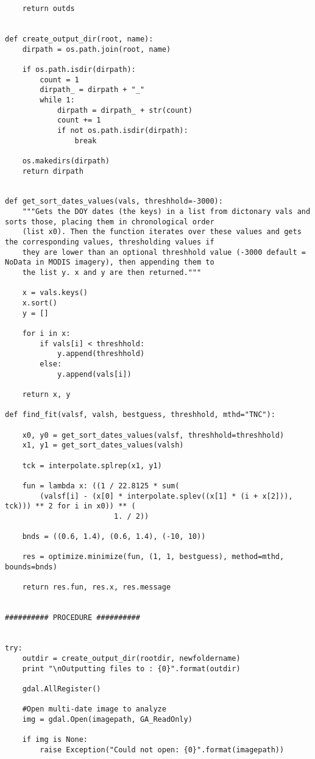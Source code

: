 \begin{verbatim}
    return outds


def create_output_dir(root, name):
    dirpath = os.path.join(root, name)

    if os.path.isdir(dirpath):
        count = 1
        dirpath_ = dirpath + "_"
        while 1:
            dirpath = dirpath_ + str(count)
            count += 1
            if not os.path.isdir(dirpath):
                break

    os.makedirs(dirpath)
    return dirpath


def get_sort_dates_values(vals, threshhold=-3000):
    """Gets the DOY dates (the keys) in a list from dictonary vals and sorts those, placing them in chronological order
    (list x0). Then the function iterates over these values and gets the corresponding values, thresholding values if
    they are lower than an optional threshhold value (-3000 default = NoData in MODIS imagery), then appending them to
    the list y. x and y are then returned."""

    x = vals.keys()
    x.sort()
    y = []

    for i in x:
        if vals[i] < threshhold:
            y.append(threshhold)
        else:
            y.append(vals[i])

    return x, y

def find_fit(valsf, valsh, bestguess, threshhold, mthd="TNC"):

    x0, y0 = get_sort_dates_values(valsf, threshhold=threshhold)
    x1, y1 = get_sort_dates_values(valsh)

    tck = interpolate.splrep(x1, y1)

    fun = lambda x: ((1 / 22.8125 * sum(
        (valsf[i] - (x[0] * interpolate.splev((x[1] * (i + x[2])), tck))) ** 2 for i in x0)) ** (
                         1. / 2))

    bnds = ((0.6, 1.4), (0.6, 1.4), (-10, 10))

    res = optimize.minimize(fun, (1, 1, bestguess), method=mthd, bounds=bnds)

    return res.fun, res.x, res.message


########## PROCEDURE ##########


try:
    outdir = create_output_dir(rootdir, newfoldername)
    print "\nOutputting files to : {0}".format(outdir)

    gdal.AllRegister()

    #Open multi-date image to analyze
    img = gdal.Open(imagepath, GA_ReadOnly)

    if img is None:
        raise Exception("Could not open: {0}".format(imagepath))


\end{verbatim}
